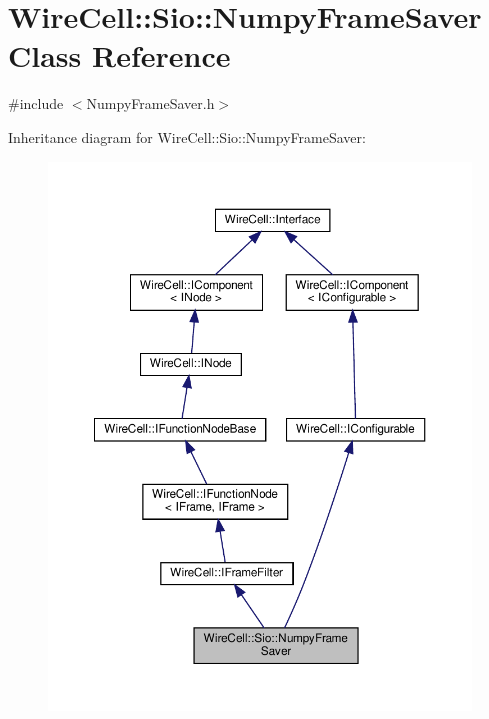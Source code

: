 \hypertarget{class_wire_cell_1_1_sio_1_1_numpy_frame_saver}{}\section{Wire\+Cell\+:\+:Sio\+:\+:Numpy\+Frame\+Saver Class Reference}
\label{class_wire_cell_1_1_sio_1_1_numpy_frame_saver}


{\ttfamily \#include $<$Numpy\+Frame\+Saver.\+h$>$}



Inheritance diagram for Wire\+Cell\+:\+:Sio\+:\+:Numpy\+Frame\+Saver\+:
\nopagebreak
\begin{figure}[H]
\begin{center}
\leavevmode
\includegraphics[width=350pt]{class_wire_cell_1_1_sio_1_1_numpy_frame_saver__inherit__graph}
\end{center}
\end{figure}


